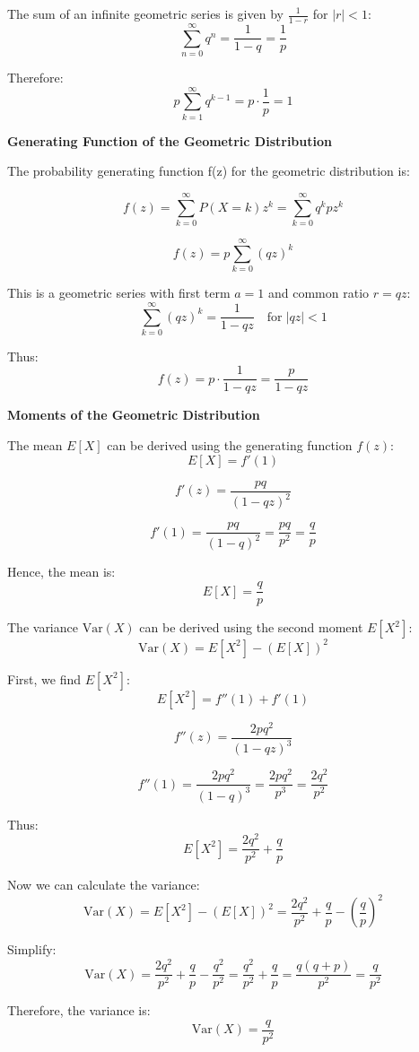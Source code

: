 The sum of an infinite geometric series is given by \( \frac{1}{1 - r} \) for \( |r| < 1 \):
\[
    \sum_{n=0}^{\infty} q^n = \frac{1}{1 - q} = \frac{1}{p}
\]

Therefore:
\[
    p \sum_{k=1}^{\infty} q^{k-1} = p \cdot \frac{1}{p} = 1
\]


\textbf{Generating Function of the Geometric Distribution}

The probability generating function f(z) for the geometric distribution is:

\[
    f(z) = \sum_{k=0}^{\infty} P(X = k) z^k = \sum_{k=0}^{\infty} q^k p z^k
\]

\[
    f(z) = p \sum_{k=0}^{\infty} (qz)^k
\]

This is a geometric series with first term $a = 1$ and common ratio $r = qz$:
\[
    \sum_{k=0}^{\infty} (qz)^k = \frac{1}{1 - qz} \quad \text{for} \; |qz| < 1
\]

Thus:
\[
    f(z) = p \cdot \frac{1}{1 - qz} = \frac{p}{1 - qz}
\]

\textbf{Moments of the Geometric Distribution}


The mean $E[X]$ can be derived using the generating function $f(z)$:
\[
    E[X] = f'(1)
\]


\[
    f'(z) = \frac{pq}{(1 - qz)^2}
\]

\[
    f'(1) = \frac{pq}{(1 - q)^2} = \frac{pq}{p^2} = \frac{q}{p}
\]

Hence, the mean is:
\[
    E[X] = \frac{q}{p}
\]


The variance $\text{Var}(X)$ can be derived using the second moment $E[X^2]$:
\[
    \text{Var}(X) = E[X^2] - (E[X])^2
\]

First, we find $E[X^2]$:
\[
    E[X^2] = f''(1) + f'(1)
\]

\[
    f''(z) = \frac{2pq^2}{(1 - qz)^3}
\]

\[
    f''(1) = \frac{2pq^2}{(1 - q)^3} = \frac{2pq^2}{p^3} = \frac{2q^2}{p^2}
\]

Thus:
\[
    E[X^2] = \frac{2q^2}{p^2} + \frac{q}{p}
\]

Now we can calculate the variance:
\[
    \text{Var}(X) = E[X^2] - (E[X])^2 = \frac{2q^2}{p^2} + \frac{q}{p} - \left(\frac{q}{p}\right)^2
\]

Simplify:
\[
    \text{Var}(X) = \frac{2q^2}{p^2} + \frac{q}{p} - \frac{q^2}{p^2} = \frac{q^2}{p^2} + \frac{q}{p} = \frac{q(q+p)}{p^2} = \frac{q}{p^2}
\]

Therefore, the variance is:
\[
    \text{Var}(X) = \frac{q}{p^2}
\]


